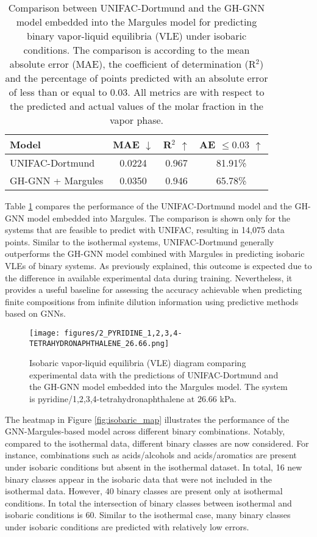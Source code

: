 \begin{table}[h]
\centering
  \caption{Comparison between UNIFAC-Dortmund and the GH-GNN model embedded into the Margules model for predicting binary vapor-liquid equilibria (VLE) under isobaric conditions. The comparison is according to the mean absolute error (MAE), the coefficient of determination (R$^2$) and the percentage of points predicted with an absolute error of less than or equal to 0.03. All metrics are with respect to the predicted and actual values of the molar fraction in the vapor phase.}
  \label{tbl:isobaric}
  \small
  \begin{tabular*}{1\textwidth}{@{\extracolsep{\fill}}lccc}
    \hline
    \textbf{Model} & \textbf{MAE} $\downarrow$ & \textbf{R$^2$} $\uparrow$ & \textbf{AE $\leq 0.03$} $\uparrow$ \\
    \hline
    UNIFAC-Dortmund & 0.0224 & 0.967 & 81.91\% \\
    GH-GNN + Margules & 0.0350 & 0.946 & 65.78\% \\
    \hline
  \end{tabular*}
\end{table}

Table \ref{tbl:isobaric} compares the performance of the UNIFAC-Dortmund model and the GH-GNN model embedded into Margules. The comparison is shown only for the systems that are feasible to predict with UNIFAC, resulting in 14,075 data points. Similar to the isothermal systems, UNIFAC-Dortmund generally outperforms the GH-GNN model combined with Margules in predicting isobaric VLEs of binary systems. As previously explained, this outcome is expected due to the difference in available experimental data during training. Nevertheless, it provides a useful baseline for assessing the accuracy achievable when predicting finite compositions from infinite dilution information using predictive methods based on GNNs.

\begin{figure}[h!]
    \centering
    \texttt{[image: figures/2\_PYRIDINE\_1,2,3,4-TETRAHYDRONAPHTHALENE\_26.66.png]}
    \caption{Isobaric vapor-liquid equilibria (VLE) diagram comparing experimental data with the predictions of UNIFAC-Dortmund and the GH-GNN model embedded into the Margules model. The system is pyridine/1,2,3,4-tetrahydronaphthalene at 26.66 kPa.}
    \label{fig:isobaric_diagram_1}
\end{figure}

The heatmap in Figure \ref{fig:isobaric_map} illustrates the performance of the GNN-Margules-based model across different binary combinations. Notably, compared to the isothermal data, different binary classes are now considered. For instance, combinations such as acids/alcohols and acids/aromatics are present under isobaric conditions but absent in the isothermal dataset. In total, 16 new binary classes appear in the isobaric data that were not included in the isothermal data. However, 40 binary classes are present only at isothermal conditions. In total the intersection of binary classes between isothermal and isobaric conditions is 60. Similar to the isothermal case, many binary classes under isobaric conditions are predicted with relatively low errors.

